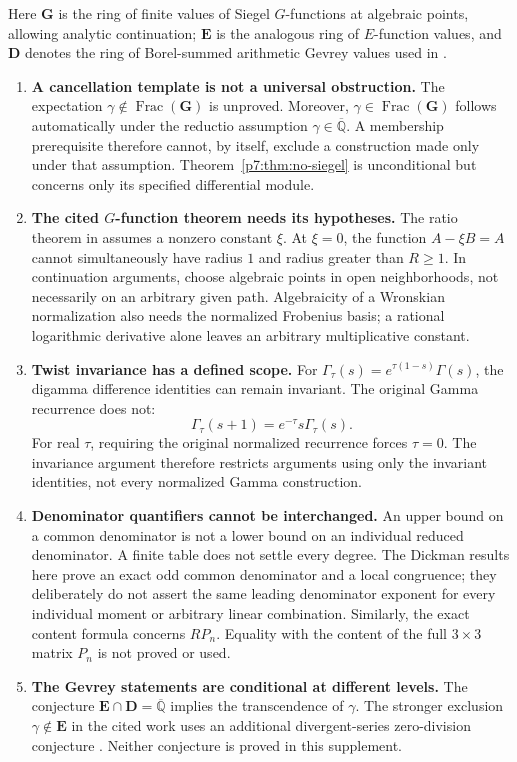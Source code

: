 \documentclass[11pt,a4paper]{article}
\theoremstyle{definition}
\theoremstyle{remark}
\newcommand{\Qbar}{\overline{\mathbb Q}}
\newcommand{\bG}{\mathbf G}
\newcommand{\bE}{\mathbf E}
\newcommand{\bD}{\mathbf D}
\DeclareMathOperator{\Frac}{Frac}
\numberwithin{equation}{section}
\begin{document}
Here $\bG$ is the ring of finite values of Siegel $G$-functions at
algebraic points, allowing analytic continuation; $\bE$ is the analogous
ring of $E$-function values, and $\bD$ denotes the ring of Borel-summed
arithmetic Gevrey values used in \cite{p7:FR2024}.

\begin{enumerate}
\item \textbf{A cancellation template is not a universal obstruction.}
The expectation $\gamma\notin\Frac(\bG)$ is unproved. Moreover,
$\gamma\in\Frac(\bG)$ follows automatically under the reductio assumption
$\gamma\in\Qbar$. A membership prerequisite therefore cannot, by itself,
exclude a construction made only under that assumption.
Theorem~\ref{p7:thm:no-siegel} is unconditional but concerns only its
specified differential module.

\item \textbf{The cited $G$-function theorem needs its hypotheses.}
The ratio theorem in \cite{p7:FR2014} assumes a nonzero constant $\xi$.
At $\xi=0$, the function $A-\xi B=A$ cannot simultaneously have radius
$1$ and radius greater than $R\ge1$. In continuation arguments, choose
algebraic points in open neighborhoods, not necessarily on an arbitrary
given path. Algebraicity of a Wronskian normalization also needs the
normalized Frobenius basis; a rational logarithmic derivative alone
leaves an arbitrary multiplicative constant.

\item \textbf{Twist invariance has a defined scope.}
For $\Gamma_\tau(s)=e^{\tau(1-s)}\Gamma(s)$, the digamma difference
identities can remain invariant. The original Gamma recurrence does not:
\[
 \Gamma_\tau(s+1)=e^{-\tau}s\Gamma_\tau(s).
\]
For real $\tau$, requiring the original normalized recurrence forces
$\tau=0$. The invariance argument therefore restricts arguments using
only the invariant identities, not every normalized Gamma construction.

\item \textbf{Denominator quantifiers cannot be interchanged.}
An upper bound on a common denominator is not a lower bound on an
individual reduced denominator. A finite table does not settle every
degree. The Dickman results here prove an exact odd common denominator
and a local congruence; they deliberately do not assert the same leading
denominator exponent for every individual moment or arbitrary linear
combination. Similarly, the exact content formula concerns $RP_n$.
Equality with the content of the full $3\times3$ matrix $P_n$ is not
proved or used.

\item \textbf{The Gevrey statements are conditional at different levels.}
The conjecture $\bE\cap\bD=\Qbar$ implies the transcendence of $\gamma$.
The stronger exclusion $\gamma\notin\bE$ in the cited work uses an
additional divergent-series zero-division conjecture
\cite{p7:FR2024}. Neither conjecture is proved in this supplement.
\end{enumerate}
\end{document}
